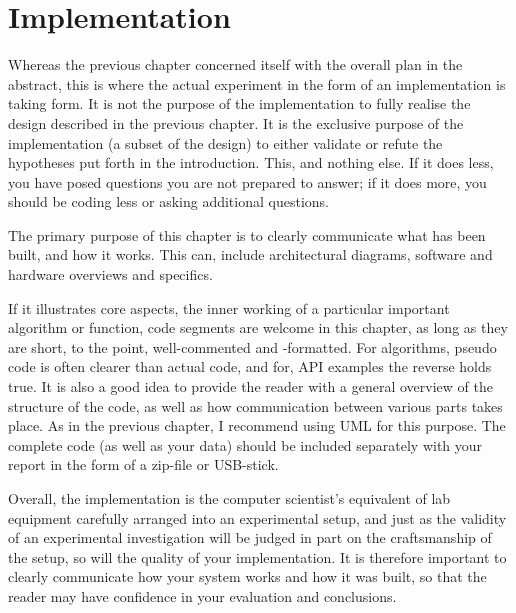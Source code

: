 \chapter{Implementation}
\label{cha:implementation}

Whereas the previous chapter concerned itself with the overall plan in
the abstract, this is where the actual experiment in the form of an
implementation is taking form.  It is not the purpose of the
implementation to fully realise the design described in the previous
chapter. It is the exclusive purpose of the implementation (a subset
of the design) to either validate or refute the hypotheses put forth
in the introduction. This, and nothing else. If it does less, you have
posed questions you are not prepared to answer; if it does more, you
should be coding less or asking additional questions.

The primary purpose of this chapter is to clearly communicate what has
been built, and how it works. This can, \eg include architectural
diagrams, software and hardware overviews and specifics.

If it illustrates core aspects, \eg the inner working of a particular
important algorithm or function, code segments are welcome in this
chapter, as long as they are short, to the point, well-commented and
-formatted.  For algorithms, pseudo code is often clearer than actual
code, and for, \eg \acs{API} examples the reverse holds true.  It is
also a good idea to provide the reader with a general overview of the
structure of the code, as well as how communication between various
parts takes place.  As in the previous chapter, I recommend using
\ac{UML} for this purpose.  The complete code (as well as your data)
should be included separately with your report in the form of a
zip-file or USB-stick.

Overall, the implementation is the computer scientist's equivalent of
lab equipment carefully arranged into an experimental setup, and just
as the validity of an experimental investigation will be judged in
part on the craftsmanship of the setup, so will the quality of your
implementation. It is therefore important to clearly communicate how
your system works and how it was built, so that the reader may have
confidence in your evaluation and conclusions.



